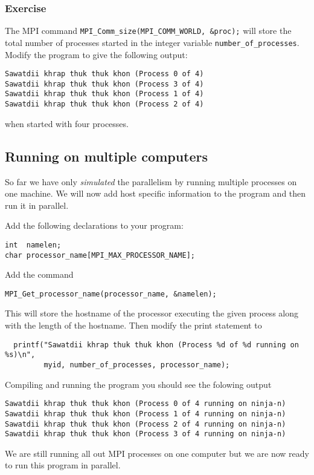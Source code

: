 \documentclass[12pt]{article}
\begin{document}
\subsubsection*{Exercise}
The MPI command \texttt{MPI\_Comm\_size(MPI\_COMM\_WORLD, \&proc);} will
store the total number of processes started in the integer variable
\texttt{number\_of\_processes}. Modify the program
to give the following output:
\begin{verbatim}
Sawatdii khrap thuk thuk khon (Process 0 of 4)
Sawatdii khrap thuk thuk khon (Process 3 of 4)
Sawatdii khrap thuk thuk khon (Process 1 of 4)
Sawatdii khrap thuk thuk khon (Process 2 of 4)
\end{verbatim}
when started with four processes.


\subsection*{Running on multiple computers}

So far we have only \emph{simulated} the parallelism by running
multiple processes on one machine.
We will now add host specific information to the program and then run it
in parallel.

Add the following declarations to your program:
\begin{verbatim}
int  namelen;
char processor_name[MPI_MAX_PROCESSOR_NAME];
\end{verbatim}

Add the command
\begin{verbatim}
MPI_Get_processor_name(processor_name, &namelen);
\end{verbatim}
This will store the hostname of the processor executing the given process
along with the length of the hostname. Then modify the print statement to
\begin{verbatim}
  printf("Sawatdii khrap thuk thuk khon (Process %d of %d running on %s)\n",
         myid, number_of_processes, processor_name);
\end{verbatim}
Compiling and running the program you should see the folowing output
\begin{verbatim}
Sawatdii khrap thuk thuk khon (Process 0 of 4 running on ninja-n)
Sawatdii khrap thuk thuk khon (Process 1 of 4 running on ninja-n)
Sawatdii khrap thuk thuk khon (Process 2 of 4 running on ninja-n)
Sawatdii khrap thuk thuk khon (Process 3 of 4 running on ninja-n)
\end{verbatim}
We are still running all out MPI processes on one computer but we are
now ready to run this program in parallel.
\end{document}
